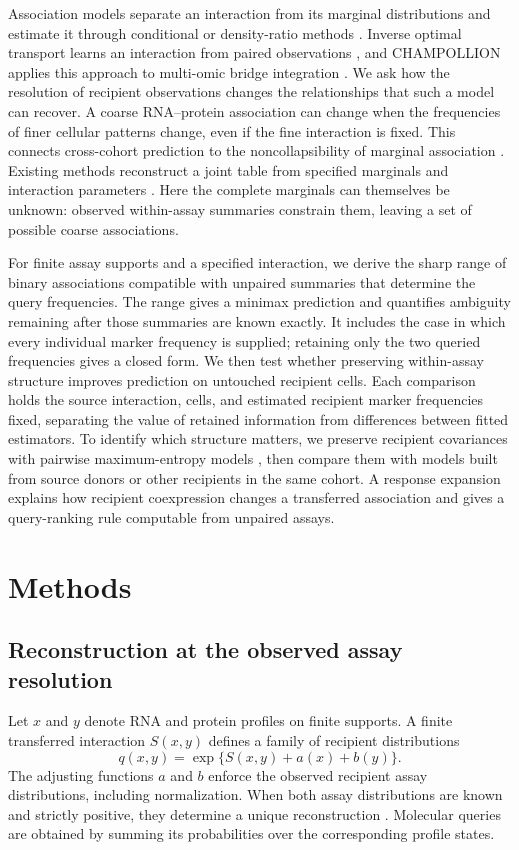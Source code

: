 \documentclass[pdflatex,sn-vancouver-num,iicol]{sn-jnl}
\begin{document}
Association models separate an interaction from its marginal distributions
and estimate it through conditional or density-ratio methods
\cite{sei,sei2026}. Inverse optimal transport learns an interaction from paired
observations \cite{li}, and CHAMPOLLION applies this approach to multi-omic
bridge integration \cite{champollion}. We ask how the resolution of recipient
observations changes the relationships that such a model can recover. A coarse
RNA--protein association can change when the frequencies of finer cellular
patterns change, even if the fine interaction is fixed. This connects
cross-cohort prediction to the noncollapsibility of marginal association
\cite{ghosh,bergsma2002}. Existing methods reconstruct a joint table from
specified marginals and interaction parameters \cite{hammond2024}. Here the
complete marginals can themselves be unknown: observed within-assay summaries
constrain them, leaving a set of possible coarse associations.

For finite assay supports and a specified interaction, we derive the sharp
range of binary associations compatible with unpaired summaries that determine
the query frequencies. The range gives a minimax prediction and quantifies
ambiguity remaining after those summaries are known exactly. It includes the
case in which every individual marker frequency is supplied; retaining only
the two queried frequencies gives a closed form.
We then test whether preserving within-assay structure improves prediction
on untouched recipient cells. Each comparison holds the source interaction,
cells, and estimated recipient marker frequencies fixed, separating the value
of retained information from differences between fitted estimators.
To identify which structure matters, we preserve recipient covariances with
pairwise maximum-entropy models \cite{schneidman}, then compare them with
models built from source donors or other recipients in the same cohort.
A response expansion explains how recipient coexpression changes a transferred
association and gives a query-ranking rule computable from unpaired assays.

\section{Methods}
\subsection{Reconstruction at the observed assay resolution}
Let $x$ and $y$ denote RNA and protein profiles on finite supports. A finite transferred interaction
$S(x,y)$ defines a family of recipient distributions
\begin{equation}
 q(x,y)=\exp\{S(x,y)+a(x)+b(y)\}.
 \label{eq:joint}
\end{equation}
The adjusting functions $a$ and $b$ enforce the observed recipient assay
distributions, including normalization. When both assay distributions are
known and strictly positive, they determine a unique reconstruction \cite{sei}. Molecular queries are
obtained by summing its probabilities over the corresponding profile states.
\end{document}
